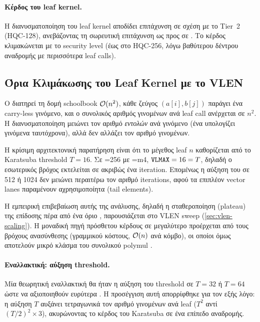 \paragraph{Κέρδος του \vclmul{} leaf kernel.}
Η διανυσματοποίηση του leaf kernel αποδίδει επιτάχυνση  σε σχέση με
το Tier~2 (HQC-128), ανεβάζοντας τη σωρευτική επιτάχυνση ως προς
 σε . Το κέρδος κλιμακώνεται με το
security level (έως  στο HQC-256, λόγω βαθύτερου δέντρου
αναδρομής με περισσότερα leaf calls).

\subsection{Όρια Κλιμάκωσης του Leaf Kernel με το VLEN}
\label{ssec:leaf-vlen-tradeoff}

Ο  διατηρεί τη δομή schoolbook $\mathcal{O}(n^2)$, κάθε
ζεύγος $(a[i], b[j])$ παράγει ένα carry-less γινόμενο, και ο συνολικός
αριθμός γινομένων ανά leaf call ανέρχεται σε $n^2$. Η διανυσματοποίηση
μειώνει τον αριθμό \emph{εντολών} ανά γινόμενο (ένα \vclmul{} υπολογίζει
\VLMAX γινόμενα ταυτόχρονα), αλλά δεν αλλάζει τον αριθμό γινομένων.

Η κρίσιμη αρχιτεκτονική παρατήρηση είναι ότι το μέγεθος leaf 
$n$ καθορίζεται από το Karatsuba threshold $T=16$. Σε \VLEN=\num{256} 
με \LMUL=m4, $\texttt{VLMAX} = 16 = T$, δηλαδή ο εσωτερικός βρόχος
εκτελείται σε ακριβώς ένα iteration. Επομένως η αύξηση του \VLEN σε \num{512} ή
\num{1024} δεν μειώνει περαιτέρω τον αριθμό iterations, αφού τα επιπλέον vector 
lanes παραμένουν αχρησιμοποίητα (tail elements).

Η εμπειρική επιβεβαίωση αυτής της ανάλυσης, δηλαδή η σταθεροποίηση
(plateau) της επίδοσης πέρα από ένα όριο \VLEN, παρουσιάζεται στο VLEN
sweep (\cref{sec:vlen-scaling}). Η μοναδική πηγή πρόσθετου κέρδους σε
μεγαλύτερο \VLEN προέρχεται από τους βρόχους ανασύνθεσης (γραμμικού
κόστους, $\mathcal{O}(n)$ ανά κόμβο), οι οποίοι όμως αποτελούν μικρό κλάσμα του
συνολικού polymul \instret.

\paragraph{Εναλλακτική: αύξηση threshold.}
Μία θεωρητική εναλλακτική θα ήταν η αύξηση του threshold σε $T=32$ ή
$T=64$ ώστε να αξιοποιηθούν ευρύτερα \VLEN. Η προσέγγιση αυτή
απορρίφθηκε για τον εξής λόγο: η αύξηση $T$ αυξάνει τετραγωνικά
τον αριθμό γινομένων ανά leaf ($T^2$ αντί $(T/2)^2 \times 3$), ακυρώνοντας
το κέρδος του Karatsuba σε ένα επίπεδο αναδρομής.

